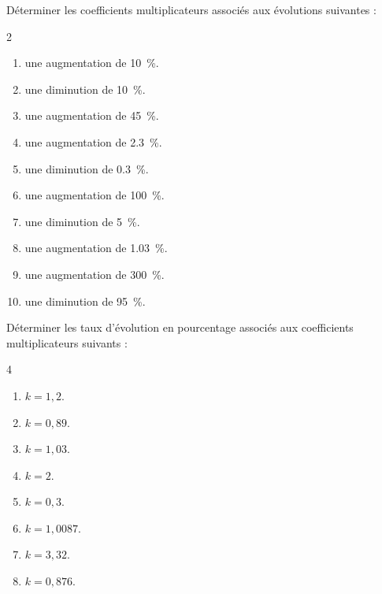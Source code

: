 \exo

Déterminer les coefficients multiplicateurs associés aux évolutions suivantes :

\vspace{-12pt}
\setlength{\columnsep}{1cm}
\setlength{\columnseprule}{0pt}
\begin{multicols}{2}
\begin{enumerate}
\item une augmentation de \SI{10}{\percent}.
\item une diminution de \SI{10}{\percent}.
\item une augmentation de \SI{45}{\percent}.
\item une augmentation de \SI{2,3}{\percent}.
\item une diminution de \SI{0,3}{\percent}.
\item une augmentation de \SI{100}{\percent}.
\item une diminution de \SI{5}{\percent}.
\item une augmentation de \SI{1,03}{\percent}.
\item une augmentation de \SI{300}{\percent}.
\item une diminution de \SI{95}{\percent}.
\end{enumerate}
\end{multicols}
\vspace{-12pt}

\exo

Déterminer les taux d'évolution en pourcentage associés aux coefficients multiplicateurs suivants :

\vspace{-12pt}
\setlength{\columnsep}{1cm}
\setlength{\columnseprule}{0pt}
\begin{multicols}{4}
\begin{enumerate}
\item $k=1,2$.
\item $k=0,89$.
\item $k=1,03$.
\item $k=2$.
\item $k=0,3$.
\item $k=1,0087$.
\item $k=3,32$.
\item $k=0,876$.
\end{enumerate}
\end{multicols}
\vspace{-12pt}

\exo

